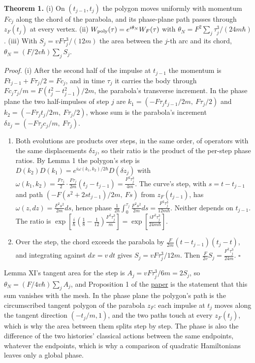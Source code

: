 \documentclass[11pt,a4paper]{article}
\begin{document}
\textbf{Theorem 1.} (i) On \((t_{j-1},t_j)\) the polygon moves uniformly
with momentum \(Fc_j\) along the chord of the parabola, and its
phase-plane path passes through \(z_F(t_j)\) at every vertex. (ii)
\(W_{\rm poly}(\tau)=e^{i\theta_N}W_F(\tau)\) with
\(\theta_N=F^2\sum_j\tau_j^3/(24m\hbar)\). (iii) With
\(S_j=vF\tau_j^3/(12m)\) the area between the \(j\)-th arc and its
chord, \(\theta_N=(F/2v\hbar)\sum_jS_j\).

\emph{Proof.} (i) After the second half of the impulse at \(t_{j-1}\)
the momentum is \(Ft_{j-1}+F\tau_j/2=Fc_j\), and in time \(\tau_j\) it
carries the body through \(Fc_j\tau_j/m=F(t_j^2-t_{j-1}^2)/2m\), the
parabola's transverse increment. In the phase plane the two
half-impulses of step \(j\) are \(k_1=(-F\tau_jt_{j-1}/2m,\ F\tau_j/2)\)
and \(k_2=(-F\tau_jt_j/2m,\ F\tau_j/2)\), whose sum is the parabola's
increment \(\delta z_j=(-F\tau_jc_j/m,\ F\tau_j)\).

\begin{enumerate}
\def\labelenumi{(\roman{enumi})}
\setcounter{enumi}{1}
\item
  Both evolutions are products over steps, in the same order, of
  operators with the same displacements \(\delta z_j\), so their ratio
  is the product of the per-step phase ratios. By Lemma 1 the polygon's
  step is \(D(k_2)D(k_1)=e^{i\omega(k_1,k_2)/2\hbar}D(\delta z_j)\) with
  \(\omega(k_1,k_2)=\frac{F\tau_j}{2}\cdot\frac{F\tau_j}{2m}(t_j-t_{j-1})=\frac{F^2\tau_j^3}{4m}\).
  The curve's step, with \(s=t-t_{j-1}\) and path
  \((-F(s^2+2st_{j-1})/2m,\ Fs)\) from \(z_F(t_{j-1})\), has
  \(\omega(z,dz)=\frac{F^2s^2}{2m}ds\), hence phase
  \(\frac1{2\hbar}\int_0^{\tau_j}\frac{F^2s^2}{2m}ds=\frac{F^2\tau_j^3}{12m\hbar}\).
  Neither depends on \(t_{j-1}\). The ratio is
  \(\exp[\frac{i}{\hbar}(\frac18-\frac1{12})\frac{F^2\tau_j^3}{m}]=\exp[\frac{iF^2\tau_j^3}{24m\hbar}]\).
\item
  Over the step, the chord exceeds the parabola by
  \(\frac{F}{2m}(t-t_{j-1})(t_j-t)\), and integrating against
  \(dx=v\,dt\) gives \(S_j=vF\tau_j^3/12m\). Then
  \(\frac{F}{2v}S_j=\frac{F^2\tau_j^3}{24m}\). \(\square\)
\end{enumerate}

Lemma XI's tangent area for the step is \(A_j=vF\tau_j^3/6m=2S_j\), so
\(\theta_N=(F/4v\hbar)\sum_jA_j\), and Proposition 1 of the
\href{planck-gap-paper.md}{paper} is the statement that this sum
vanishes with the mesh. In the phase plane the polygon's path is the
circumscribed tangent polygon of the parabola \(z_F\): each impulse at
\(t_j\) moves along the tangent direction \((-t_j/m,1)\), and the two
paths touch at every \(z_F(t_j)\), which is why the area between them
splits step by step. The phase is also the difference of the two
histories' classical actions between the same endpoints, whatever the
endpoints, which is why a comparison of quadratic Hamiltonians leaves
only a global phase.
\end{document}
